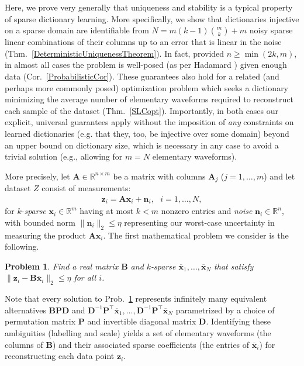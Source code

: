 \documentclass[journal, twocolumn]{IEEEtran}
\newtheorem{problem}{Problem}
\begin{document}
Here, we prove very generally that uniqueness and stability is a typical property of sparse dictionary learning. More specifically,  we show that dictionaries injective on a sparse domain are identifiable from \mbox{$N = m(k-1){m \choose k} + m$} noisy sparse linear combinations of their columns up to an error that is linear in the noise (Thm.~\ref{DeterministicUniquenessTheorem}). In fact, provided $n \geq \min(2k,m)$, in almost all cases the problem is well-posed (as per Hadamard \cite{Hadamard1902}) given enough data (Cor.~\ref{ProbabilisticCor}). These guarantees also hold for a related (and perhaps more commonly posed) optimization problem which seeks a dictionary minimizing the average number of elementary waveforms required to reconstruct each sample of the dataset (Thm.~\ref{SLCopt}). Importantly, in both cases our explicit, universal guarantees apply without the imposition of \emph{any} constraints on learned dictionaries  (e.g. that they, too, be injective over some domain) beyond an upper bound on dictionary size, which is necessary in any case to avoid a trivial solution (e.g., allowing for $m = N$ elementary waveforms). %

More precisely, let $\mathbf{A} \in \mathbb R^{n \times m}$ be a matrix with columns $\mathbf{A}_j$ ($j = 1,\ldots,m$) and let dataset $Z$ consist of measurements:
\begin{align}\label{LinearModel}
\mathbf{z}_i = \mathbf{A}\mathbf{x}_i + \mathbf{n}_i,\ \ \  \text{$i=1,\ldots,N$},
\end{align}
for $k$-\emph{sparse} $\mathbf{x}_i \in \mathbb{R}^m$ having at most $k<m$ nonzero entries and \emph{noise} $\mathbf{n}_i \in \mathbb{R}^n$, with bounded norm $\| \mathbf{n}_i \|_2 \leq  \eta$ representing our worst-case uncertainty in measuring the product $\mathbf{A}\mathbf{x}_i$. The first mathematical problem we consider is the following.

%
 
\begin{problem}\label{InverseProblem}
Find a real matrix $\mathbf{B}$ and $k$-sparse $\mathbf{\overline x}_1, \ldots, \mathbf{\overline x}_N$ that satisfy $\|\mathbf{z}_i - \mathbf{B}\mathbf{\overline x}_i\|_2 \leq \eta$ for all $i$.
\end{problem}

Note that every solution to Prob.~\ref{InverseProblem} represents infinitely many equivalent alternatives $\mathbf{BPD}$ and $\mathbf{D}^{-1}\mathbf{P}^{\top}\mathbf{\overline x}_1, \ldots, \mathbf{D}^{-1}\mathbf{P}^{\top}\mathbf{\overline x}_N$ parametrized by a choice of permutation matrix $\mathbf{P}$ and invertible diagonal matrix $\mathbf{D}$. Identifying these ambiguities (labelling and scale) yields a set of elementary waveforms (the columns of $\mathbf{B}$) and their associated sparse coefficients (the entries of $\mathbf{\overline x}_i$) for reconstructing each data point $\mathbf{z}_i$. 
\end{document}
